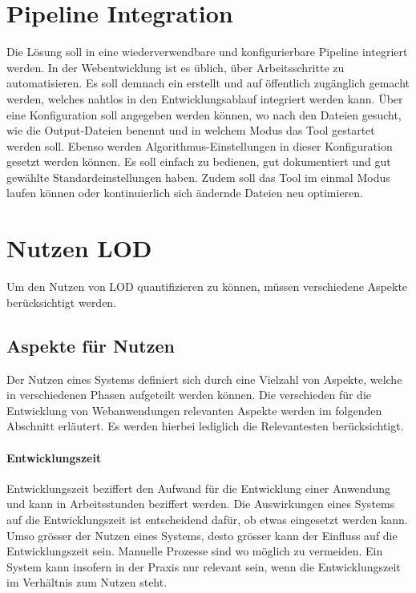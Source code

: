 \section{Pipeline Integration}
Die Lösung soll in eine wiederverwendbare und konfigurierbare Pipeline integriert werden.
In der Webentwicklung ist es üblich, über  Arbeitsschritte zu automatisieren. Es soll demnach ein  erstellt und auf  öffentlich zugänglich gemacht werden, welches nahtlos in den Entwicklungsablauf integriert werden kann. Über eine Konfiguration soll angegeben werden können, wo nach den  Dateien gesucht, wie die Output-Dateien benennt und in welchem Modus das Tool gestartet werden soll. Ebenso werden Algorithmus-Einstellungen in dieser Konfiguration gesetzt werden können. Es soll einfach zu bedienen, gut dokumentiert und gut gewählte Standardeinstellungen haben. Zudem soll das Tool im einmal Modus laufen können oder kontinuierlich sich ändernde Dateien neu optimieren.

\section{Nutzen LOD}
Um den Nutzen von LOD quantifizieren zu können, müssen verschiedene Aspekte berücksichtigt werden.

\subsection{Aspekte für Nutzen}

Der Nutzen eines Systems definiert sich durch eine Vielzahl von Aspekte, welche in verschiedenen Phasen aufgeteilt werden können. Die verschieden für die Entwicklung von Webanwendungen relevanten Aspekte werden im folgenden Abschnitt erläutert. Es werden hierbei lediglich die Relevantesten berücksichtigt.

\paragraph{Entwicklungszeit}

Entwicklungszeit beziffert den Aufwand für die Entwicklung einer Anwendung und kann in Arbeitsstunden beziffert werden.
Die Auswirkungen eines Systems auf die Entwicklungszeit ist entscheidend dafür, ob etwas eingesetzt werden kann. Umso grösser der Nutzen eines Systems, desto grösser kann der Einfluss auf die Entwicklungszeit sein. Manuelle Prozesse sind wo möglich zu vermeiden. Ein System kann insofern in der Praxis nur relevant sein, wenn die Entwicklungszeit im Verhältnis zum Nutzen steht.


